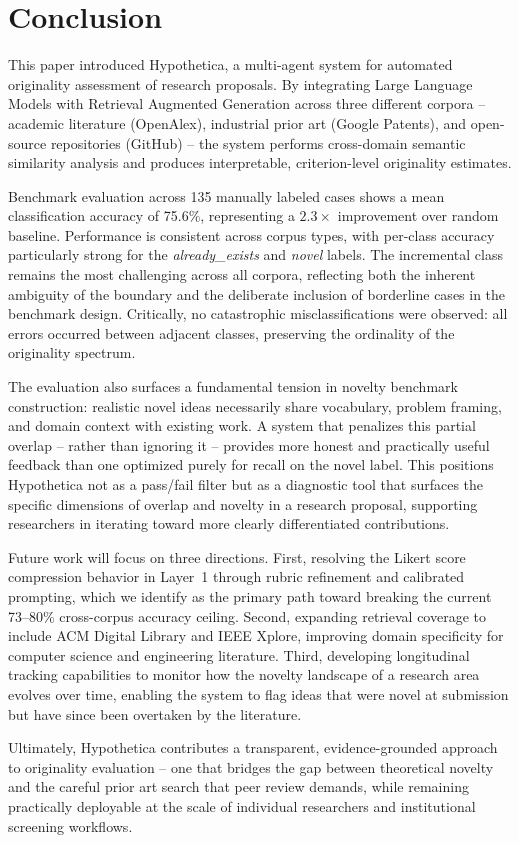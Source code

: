 \section{Conclusion}
\label{sec:conclusion}

This paper introduced Hypothetica, a multi-agent system for automated originality assessment of research proposals. By integrating Large Language Models with Retrieval Augmented Generation across three different corpora -- academic literature (OpenAlex), industrial prior art (Google Patents), and open-source repositories (GitHub) -- the system performs cross-domain semantic similarity analysis and produces interpretable, criterion-level originality estimates.

Benchmark evaluation across 135 manually labeled cases shows a mean classification accuracy of 75.6\%, representing a $2.3\times$ improvement over random baseline. Performance is consistent across corpus types, with per-class accuracy particularly strong for the \textit{already\_exists} and \textit{novel} labels. The incremental class remains the most challenging across all corpora, reflecting both the inherent ambiguity of the boundary and the deliberate inclusion of borderline cases in the benchmark design. Critically, no catastrophic misclassifications were observed: all errors occurred between adjacent classes, preserving the ordinality of the originality spectrum.

The evaluation also surfaces a fundamental tension in novelty benchmark construction: realistic novel ideas necessarily share vocabulary, problem framing, and domain context with existing work. A system that penalizes this partial overlap -- rather than ignoring it -- provides more honest and practically useful feedback than one optimized purely for recall on the novel label. This positions Hypothetica not as a pass/fail filter but as a diagnostic tool that surfaces the specific dimensions of overlap and novelty in a research proposal, supporting researchers in iterating toward more clearly differentiated contributions.

Future work will focus on three directions. First, resolving the Likert score compression behavior in Layer~1 through rubric refinement and calibrated prompting, which we identify as the primary path toward breaking the current 73--80\% cross-corpus accuracy ceiling. Second, expanding retrieval coverage to include ACM Digital Library and IEEE Xplore, improving domain specificity for computer science and engineering literature. Third, developing longitudinal tracking capabilities to monitor how the novelty landscape of a research area evolves over time, enabling the system to flag ideas that were novel at submission but have since been overtaken by the literature.

Ultimately, Hypothetica contributes a transparent, evidence-grounded approach to originality evaluation -- one that bridges the gap between theoretical novelty and the careful prior art search that peer review demands, while remaining practically deployable at the scale of individual researchers and institutional screening workflows.
